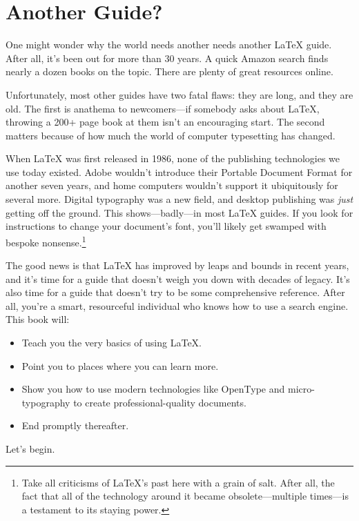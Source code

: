 \chapter{Another Guide?}

One might wonder why the world needs another needs another \LaTeX{} guide.
After all, it's been out for more than 30 years.
A quick Amazon search finds nearly a dozen books on the topic.
There are plenty of great resources online.

Unfortunately, most other guides have two fatal flaws: they are long,
and they are old.
The first is anathema to newcomers---if somebody asks about \LaTeX{},
throwing a 200+ page book at them isn't an encouraging start.
The second matters because of how much the world of computer typesetting has
changed.

When \LaTeX{} was first released in 1986, none of the publishing technologies
we use today existed.
Adobe wouldn't introduce their Portable Document Format for another seven years,
and home computers wouldn't support it ubiquitously for several more.
Digital typography was a new field, and desktop publishing was \emph{just}
getting off the ground.\punckern{}
This shows---badly---in most \LaTeX{} guides.
If you look for instructions to change your document's font,
you'll likely get swamped with bespoke nonsense.\punckern\footnote{%
Take all criticisms of \LaTeX's past here with a grain of
salt. After all, the fact that all of the technology around it became
obsolete---multiple times---is a testament to its staying power.}

The good news is that  \LaTeX{} has improved by leaps and bounds in recent years,
and it's time for a guide that doesn't weigh you down with decades of legacy.
It's also time for a guide that doesn't try to be some comprehensive reference.
After all, you're a smart, resourceful individual who knows how to use a search
engine.
This book will:
\begin{itemize}
\item Teach you the very basics of using \LaTeX.
\item Point you to places where you can learn more.
\item Show you how to use modern technologies like OpenType and micro-typography
    to create professional-quality documents.
\item End promptly thereafter.
\end{itemize}
Let's begin.
